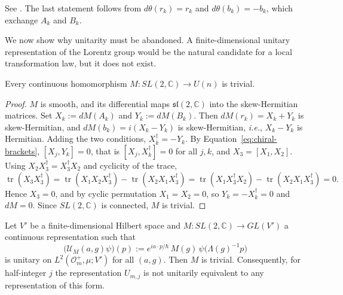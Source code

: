 	\noindent See \cite[TODO-location]{TODO-Hal03}. The last statement follows from $d\theta(r_k)=r_k$ and $d\theta(b_k)=-b_k$, which exchange $A_k$ and $B_k$.
	
	We now show why unitarity must be abandoned. A finite-dimensional unitary representation of the Lorentz group would be the natural candidate for a local transformation law, but it does not exist.
	
	\begin{proposition}\label{prop:no-unitary}
		Every continuous homomorphism $M:SL(2,\mathbb{C})\to U(n)$ is trivial.
	\end{proposition}
	
	\begin{proof}
		$M$ is smooth, and its differential maps $\mathfrak{sl}(2,\mathbb{C})$ into the skew-Hermitian matrices. Set $X_k:=dM(A_k)$ and $Y_k:=dM(B_k)$. Then $dM(r_k)=X_k+Y_k$ is skew-Hermitian, and $dM(b_k)=i(X_k-Y_k)$ is skew-Hermitian, \textit{i.e.}, $X_k-Y_k$ is Hermitian. Adding the two conditions, $X_k^\dagger=-Y_k$. By Equation~\eqref{eq:chiral-brackets}, $[X_j,Y_k]=0$, that is $[X_j,X_k^\dagger]=0$ for all $j,k$, and $X_3=[X_1,X_2]$. Using $X_2X_3^\dagger=X_3^\dagger X_2$ and cyclicity of the trace,
		\begin{equation*}
			\operatorname{tr}(X_3X_3^\dagger)=\operatorname{tr}(X_1X_2X_3^\dagger)-\operatorname{tr}(X_2X_1X_3^\dagger)=\operatorname{tr}(X_1X_3^\dagger X_2)-\operatorname{tr}(X_2X_1X_3^\dagger)=0.
		\end{equation*}
		Hence $X_3=0$, and by cyclic permutation $X_1=X_2=0$, so $Y_k=-X_k^\dagger=0$ and $dM=0$. Since $SL(2,\mathbb{C})$ is connected, $M$ is trivial.
	\end{proof}
	
	\begin{proposition}\label{prop:no-local-unitary}
		Let $V'$ be a finite-dimensional Hilbert space and $M:SL(2,\mathbb{C})\to GL(V')$ a continuous representation such that
		\begin{equation*}
			\big(\mathcal{U}_M(a,g)\psi\big)(p):=e^{ia\cdot p/\hbar}\,M(g)\,\psi\big(\Lambda(g)^{-1}p\big)
		\end{equation*}
		is unitary on $L^2(\mathcal{O}_m^+,\mu;V')$ for all $(a,g)$. Then $M$ is trivial. Consequently, for half-integer $j$ the representation $U_{m,j}$ is not unitarily equivalent to any representation of this form.
	\end{proposition}
	
